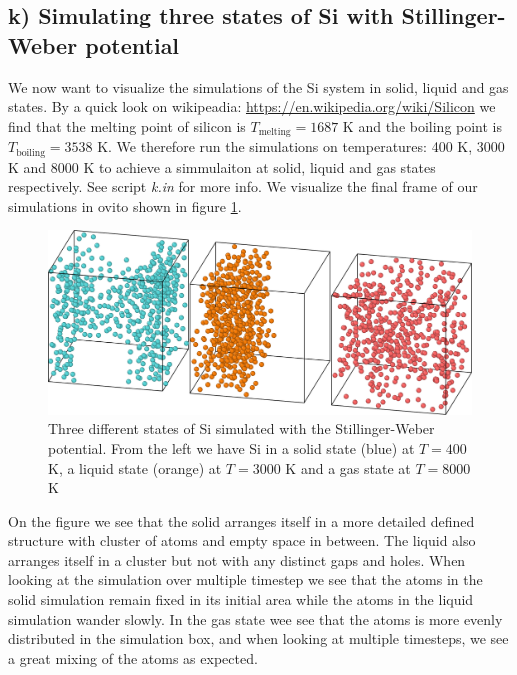 \documentclass[reprint, amsmath, amssymb, aps]{revtex4-2}
\begin{document}
\subsection*{k) Simulating three states of Si with Stillinger-Weber potential }
We now want to visualize the simulations of the Si system in solid, liquid and gas states. By a quick look on wikipeadia: \url{https://en.wikipedia.org/wiki/Silicon} we find that the melting point of silicon is $T_{\text{melting}} = 1687$ K and the boiling point is $T_{\text{boiling}} = 3538$ K. We therefore run the simulations on temperatures: 400 K, 3000 K and 8000 K to achieve a simmulaiton at solid, liquid and gas states respectively. See script \textit{k.in} for more info. We visualize the final frame of our simulations in ovito shown in figure \ref{fig:3_states}.
\begin{figure}[H]
  \includegraphics[width=\linewidth]{figures/Si_3_states.png}
  \caption{Three different states of Si simulated with the Stillinger-Weber potential. From the left we have Si in a solid state (blue) at $T = 400$ K, a liquid state (orange) at $T = 3000$ K and a gas state at $T = 8000$ K }
  \label{fig:3_states}
\end{figure}
On the figure we see that the solid arranges itself in a more detailed defined structure with cluster of atoms and empty space in between. The liquid also arranges itself in a cluster but not with any distinct gaps and holes. When looking at the simulation over multiple timestep we see that the atoms in the solid simulation remain fixed in its initial area while the atoms in the liquid simulation wander slowly. In the gas state wee see that the atoms is more evenly distributed in the simulation box, and when looking at multiple timesteps, we see a great mixing of the atoms as expected.
%
%
\end{document}
